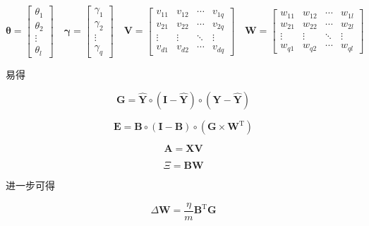 \documentclass{ctexart}
\begin{document}
	\begin{equation}
		\bm{\theta}=\begin{bmatrix}
			\theta_1\\\theta_2\\\vdots\\\theta_l
		\end{bmatrix}\quad
		\bm{\gamma}=\begin{bmatrix}
			\gamma_1\\\gamma_2\\\vdots\\\gamma_q
		\end{bmatrix}\quad
		\bm{V}=\begin{bmatrix}  
			v_{11} & v_{12} & \cdots & v_{1q} \\  
			v_{21} & v_{22} & \cdots & v_{2q} \\  
			\vdots & \vdots & \ddots & \vdots \\  
			v_{d1} & v_{d2} & \cdots & v_{dq}  
		\end{bmatrix}\quad
		\bm{W}=\begin{bmatrix}  
			w_{11} & w_{12} & \cdots & w_{1l} \\  
			w_{21} & w_{22} & \cdots & w_{2l} \\  
			\vdots & \vdots & \ddots & \vdots \\  
			w_{q1} & w_{q2} & \cdots & w_{ql}
		\end{bmatrix}
	\end{equation}

	易得
	
	\begin{equation}
		\bm{G}=\hat{\bm{Y}}\circ\left(\bm{I}-\hat{\bm{Y}}\right)\circ\left(\bm{Y}-\hat{\bm{Y}}\right)
	\end{equation}
	
	\begin{equation}
		\bm{E}=\bm{B}\circ(\bm{I}-\bm{B})\circ\left(\bm{G}\times\bm{W}^\mathrm{T}\right)
	\end{equation}

	\begin{equation}
		\bm{A}=\bm{X}\bm{V}
	\end{equation}

	\begin{equation}
		\bm{\varXi}=\bm{B}\bm{W}
	\end{equation}

	进一步可得
	
	\begin{equation}
		\Delta\bm{W}=\frac{\eta}{m} \bm{B}^\mathrm{T}\bm{G}
	\end{equation}
	
\end{document}
